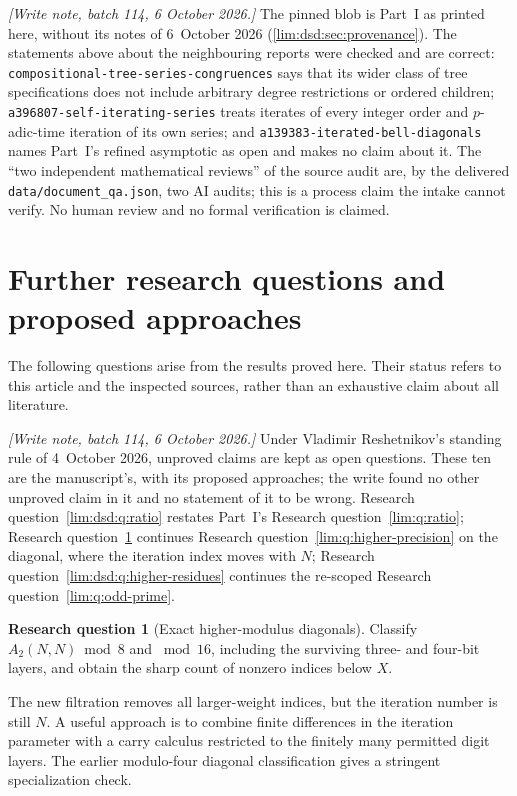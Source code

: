 \documentclass[11pt]{article}
\theoremstyle{definition}
\newtheorem{question}[theorem]{Research question}
\theoremstyle{remark}
\begin{document}
\emph{[Write note, batch 114, 6 October 2026.]} The pinned blob is Part~I as printed here, without
its notes of 6~October 2026 (\cref{lim:dsd:sec:provenance}). The statements
above about the neighbouring reports were checked and are correct:
\texttt{compositional-tree-series-congruences} says that its wider class of
tree specifications does not include arbitrary degree restrictions or
ordered children; \texttt{a396807-self-iterating-series} treats iterates of
every integer order and $p$-adic-time iteration of its own series; and
\texttt{a139383-iterated-bell-diagonals} names Part~I's refined asymptotic
as open and makes no claim about it. The ``two independent mathematical
reviews'' of the source audit are, by the delivered
\texttt{data/document\_qa.json}, two AI audits; this is a process claim the
intake cannot verify. No human review and no formal verification is
claimed.

\section{Further research questions and proposed approaches}
\label{lim:dsd:sec:questions}

The following questions arise from the results proved here. Their
status refers to this article and the inspected sources, rather
than an exhaustive claim about all literature.

\emph{[Write note, batch 114, 6 October 2026.]} Under Vladimir Reshetnikov's standing rule of
4~October 2026, unproved claims are kept as open questions. These ten are
the manuscript's, with its proposed approaches; the write found no other
unproved claim in it and no statement of it to be wrong. Research
question~\ref{lim:dsd:q:ratio} restates Part~I's Research
question~\ref{lim:q:ratio}; Research question~\ref{lim:dsd:q:diagonals}
continues Research question~\ref{lim:q:higher-precision} on the diagonal,
where the iteration index moves with $N$; Research
question~\ref{lim:dsd:q:higher-residues} continues the re-scoped Research
question~\ref{lim:q:odd-prime}.

\begin{question}[Exact higher-modulus diagonals]
\label{lim:dsd:q:diagonals}
Classify $A_2(N,N)\bmod8$ and $\bmod16$, including the surviving
three- and four-bit layers, and obtain the sharp count of nonzero
indices below $X$.
\end{question}
The new filtration removes all larger-weight indices, but the
iteration number is still $N$. A useful approach is to combine
finite differences in the iteration parameter with a carry
calculus restricted to the finitely many permitted digit layers.
The earlier modulo-four diagonal classification gives a stringent
specialization check.
\end{document}
